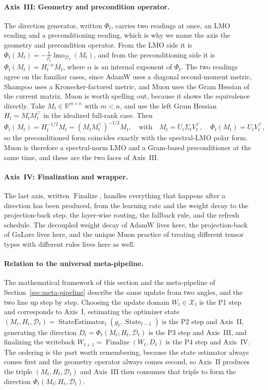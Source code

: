 \paragraph{Axis~III: Geometry and precondition operator.}
The direction generator, written $\Phi_t$, carries two readings at once, an LMO reading and a preconditioning reading, which is why we name the axis the geometry and precondition operator. From the LMO side it is $\Phi_t(M_t)=-\frac{1}{\rho_t}\operatorname{lmo}_{\mathcal{D}_t}(M_t)$, and from the preconditioning side it is $\Phi_t(M_t)=H_t^{-\alpha}M_t$, where $\alpha$ is an internal exponent of $\Phi_t$. The two readings agree on the familiar cases, since AdamW uses a diagonal second-moment metric, Shampoo uses a Kronecker-factored metric, and Muon uses the Gram Hessian of the current matrix. Muon is worth spelling out, because it shows the equivalence directly. Take $M_t\in\mathbb{R}^{m\times n}$ with $m<n$, and use the left Gram Hessian $H_t=M_t M_t^\top$ in the idealized full-rank case. Then
\begin{equation}
  \Phi_t(M_t)=H_t^{-1/2}M_t=(M_t M_t^\top)^{-1/2}M_t,
  \quad\text{with}\quad
  M_t=U_t\Sigma_t V_t^\top,
  \quad
  \Phi_t(M_t)=U_t V_t^\top,
\end{equation}
so the preconditioned form coincides exactly with the spectral-LMO polar form. Muon is therefore a spectral-norm LMO and a Gram-based preconditioner at the same time, and these are the two faces of Axis~III.

\paragraph{Axis~IV: Finalization and wrapper.}
The last axis, written $\operatorname{Finalize}$, handles everything that happens after a direction has been produced, from the learning rate and the weight decay to the projection-back step, the layer-wise routing, the fallback rule, and the refresh schedule. The decoupled weight decay of AdamW lives here, the projection-back of GaLore lives here, and the unique Muon practice of treating different tensor types with different rules lives here as well.

\paragraph{Relation to the universal meta-pipeline.}
The mathematical framework of this section and the meta-pipeline of Section~\ref{sec:meta-pipeline} describe the same update from two angles, and the two line up step by step. Choosing the update domain $W_t\in\mathcal{X}_t$ is the P1 step and corresponds to Axis~I, estimating the optimizer state $(M_t,H_t,\mathcal{D}_t)=\operatorname{StateEstimator}_t(g_t,\operatorname{State}_{t-1})$ is the P2 step and Axis~II, generating the direction $D_t=\Phi_t(M_t;H_t,\mathcal{D}_t)$ is the P3 step and Axis~III, and finalizing the writeback $W_{t+1}=\operatorname{Finalize}(W_t,D_t)$ is the P4 step and Axis~IV. The ordering is the part worth remembering, because the state estimator always comes first and the geometry operator always comes second, so Axis~II produces the triple $(M_t,H_t,\mathcal{D}_t)$ and Axis~III then consumes that triple to form the direction $\Phi_t(M_t;H_t,\mathcal{D}_t)$.

